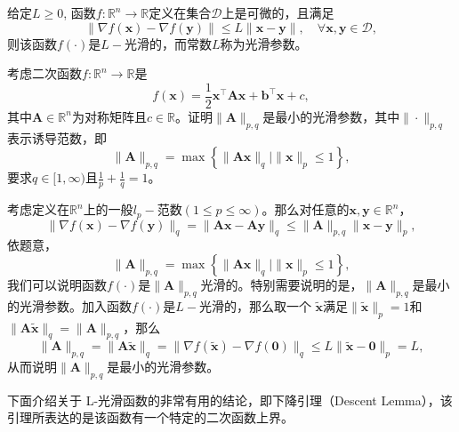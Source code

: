 \begin{definition}[$L-$光滑]
    给定$L \geq 0$, 函数$f: \mathbb{R}^{n} \rightarrow \mathbb{R}$定义在集合$\mathcal{D}$上是可微的，且满足
\begin{equation}
    \|\nabla f(\bm{x})-\nabla f(\bm{y})\| \leq L\|\bm{x}-\bm{y}\|, \quad \forall \bm{x}, \bm{y} \in \mathcal{D},
    \nonumber
\end{equation}
则该函数$f(\cdot)$是$L-$光滑的，而常数$L$称为光滑参数。
\end{definition}

\begin{problem}[二次函数的$L-$光滑]
    考虑二次函数$f: \mathbb{R}^{n} \rightarrow \mathbb{R}$是
    \begin{equation}
        f(\bm{x})=\frac{1}{2} \bm{x}^{\top} \bm{A} \bm{x}+\bm{b}^{\top} \bm{x}+c,
        \nonumber
    \end{equation}
其中$\bm{A} \in \mathbb{R}^{n}$为对称矩阵且$c \in \mathbb{R}$。证明$\|\bm{A}\|_{p, q}$是最小的光滑参数，其中$\|\cdot\|_{p, q}$表示诱导范数，即
    \begin{equation}
        \|\bm{A}\|_{p, q}=\max \left\{\|\bm{A} \bm{x}\|_{q} \mid\|\bm{x}\|_{p} \leq 1\right\},
        \nonumber
    \end{equation}
要求$q \in[1, \infty)$且$\frac{1}{p}+\frac{1}{q}=1$。
\end{problem}
\begin{solution}
    考虑定义在$\mathbb{R}^{n}$上的一般$l_{p} -$范数$(1 \leq p \leq \infty)$。那么对任意的$\bm{x}, \bm{y} \in \mathbb{R}^{n}$，
    \begin{equation}
        \|\nabla f(\bm{x})-\nabla f(\bm{y})\|_{q}=\|\bm{A} \bm{x}-\bm{A} \bm{y}\|_{q} \leq\|\bm{A}\|_{p, q}\|\bm{x}-\bm{y}\|_{p},
        \nonumber
    \end{equation}
    依题意，
    \begin{equation}
        \|\bm{A}\|_{p, q}=\max \left\{\|\bm{A} \bm{x}\|_{q} \mid\|\bm{x}\|_{p} \leq 1\right\},
        \nonumber
    \end{equation}
    我们可以说明函数$f(\cdot)$是$\|\bm{A}\|_{p, q}$光滑的。特别需要说明的是，$\|\bm{A}\|_{p, q}$是最小的光滑参数。加入函数$f(\cdot)$是$L -$光滑的，那么取一个 $\tilde{\bm{x}}$满足$\|\tilde{\bm{x}}\|_{p}=1$和$ \|\bm{A} \tilde{\bm{x}}\|_{q}=\|\bm{A}\|_{p, q}$，那么
    \begin{equation}
        \|\bm{A}\|_{p, q}=\|\bm{A} \tilde{\bm{x}}\|_{q}=\|\nabla f(\tilde{\bm{x}})-\nabla f(\mathbf{0})\|_{q} \leq L\|\tilde{\bm{x}}-\mathbf{0}\|_{p}=L,
        \nonumber
    \end{equation}
从而说明$\|\bm{A}\|_{p, q}$是最小的光滑参数。
\end{solution}
\par 下面介绍关于 L-光滑函数的非常有用的结论，即下降引理（Descent Lemma），该引理所表达的是该函数有一个特定的二次函数上界。

